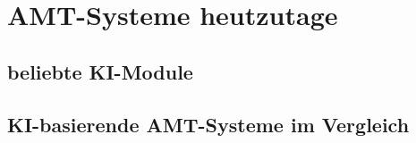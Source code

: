 \section{AMT-Systeme heutzutage}

\subsection{beliebte KI-Module}

\subsection{KI-basierende AMT-Systeme im Vergleich}
